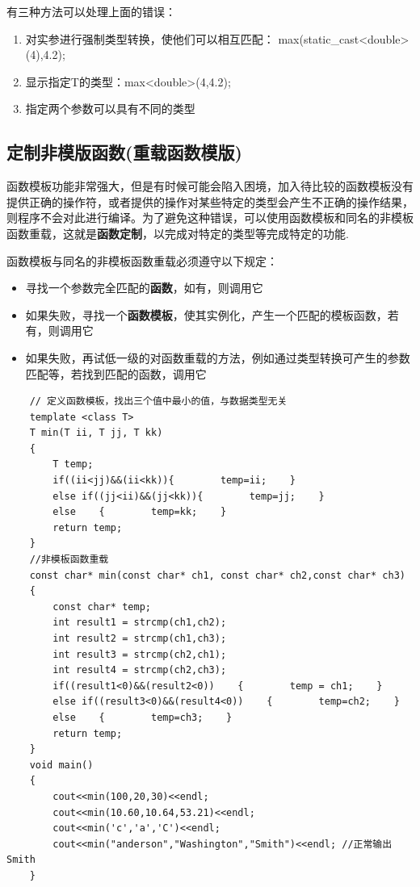\documentclass[UTF8,a4paper,12pt]{ctexbook}
\begin{document}
			有三种方法可以处理上面的错误：
			\begin{enumerate}[itemindent = 1em]
				\item 对实参进行强制类型转换，使他们可以相互匹配： max(static\_cast<double>(4),4.2);
				\item 显示指定T的类型：max<double>(4,4.2); 
				\item 指定两个参数可以具有不同的类型
			\end{enumerate}
			
	\subsection{定制非模版函数(重载函数模版)}
			函数模板功能非常强大，但是有时候可能会陷入困境，加入待比较的函数模板没有提供正确的操作符，或者提供的操作对某些特定的类型会产生不正确的操作结果，则程序不会对此进行编译。为了避免这种错误，可以使用函数模板和同名的非模板函数重载，这就是\textbf{函数定制}，以完成对特定的类型等完成特定的功能.
			
			函数模板与同名的非模板函数重载必须遵守以下规定：
			\begin{itemize}[itemindent = 1em]
				\item 寻找一个参数完全匹配的\textbf{函数}，如有，则调用它
				\item 如果失败，寻找一个\textbf{函数模板}，使其实例化，产生一个匹配的模板函数，若有，则调用它
				\item 如果失败，再试低一级的对函数重载的方法，例如通过类型转换可产生的参数匹配等，若找到匹配的函数，调用它
			\end{itemize}
		\begin{lstlisting}
	// 定义函数模板，找出三个值中最小的值，与数据类型无关 
	template <class T> 
	T min(T ii, T jj, T kk) 
	{ 
		T temp; 
		if((ii<jj)&&(ii<kk)){        temp=ii;    } 
		else if((jj<ii)&&(jj<kk)){        temp=jj;    } 
		else    {        temp=kk;    } 
		return temp; 
	} 
	//非模板函数重载 
	const char* min(const char* ch1, const char* ch2,const char* ch3) 
	{ 
		const char* temp; 
		int result1 = strcmp(ch1,ch2); 
		int result2 = strcmp(ch1,ch3); 
		int result3 = strcmp(ch2,ch1); 
		int result4 = strcmp(ch2,ch3); 
		if((result1<0)&&(result2<0))    {        temp = ch1;    } 
		else if((result3<0)&&(result4<0))    {        temp=ch2;    } 
		else    {        temp=ch3;    } 
		return temp; 
	} 
	void main() 
	{ 
		cout<<min(100,20,30)<<endl; 
		cout<<min(10.60,10.64,53.21)<<endl; 
		cout<<min('c','a','C')<<endl;     
		cout<<min("anderson","Washington","Smith")<<endl; //正常输出 Smith
	} 	
		\end{lstlisting}
\end{document}
